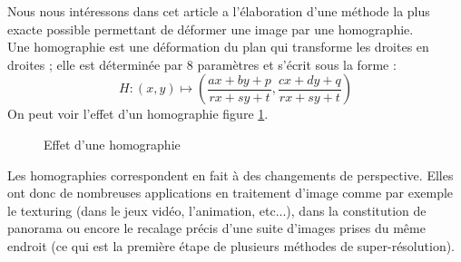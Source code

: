 



	Nous nous intéressons dans cet article a l'élaboration d'une méthode la plus exacte possible permettant de déformer une image par une homographie. \\
 	Une homographie est une déformation du plan qui transforme les droites en droites ; elle est déterminée par 8 paramètres et s'écrit sous la forme :
	\[H : (x,y)\mapsto\left( \frac{ax+by+p}{rx+sy+t},\frac{cx+dy+q}{rx+sy+t}\right)\] 
On peut voir l'effet d'un homographie figure \ref{effethom}.\\

 \begin{figure}
 
   \centering
    \arrowPDP 
   \caption{Effet d'une homographie}
\label{effethom}
 \end{figure}

	Les homographies correspondent en fait à des changements de perspective. Elles ont donc de nombreuses applications en traitement d'image comme par exemple le texturing (dans le jeux vidéo, l'animation, etc...), dans la constitution de panorama ou encore le recalage précis d'une suite d'images prises du même endroit (ce qui est la première étape de plusieurs méthodes de super-résolution).


